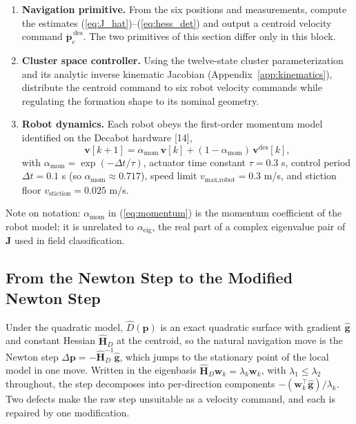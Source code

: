 \documentclass[lettersize,journal]{IEEEtran}
\begin{document}
\begin{enumerate}
    \item \textbf{Navigation primitive.} From the six positions and
          measurements, compute the estimates
          (\ref{eq:J_hat})--(\ref{eq:hess_det}) and output a centroid
          velocity command $\dot{\mathbf{p}}_c^{\,\text{des}}$. The two
          primitives of this section differ only in this block.
    \item \textbf{Cluster space controller.} Using the twelve-state
          cluster parameterization and its analytic inverse kinematic
          Jacobian (Appendix~\ref{app:kinematics}), distribute the
          centroid command to six robot velocity commands while
          regulating the formation shape to its nominal geometry.
    \item \textbf{Robot dynamics.} Each robot obeys the first-order
          momentum model identified on the Decabot hardware [14],
          \begin{equation}
              \mathbf{v}[k+1] = \alpha_{\text{mom}}\,\mathbf{v}[k]
              + (1 - \alpha_{\text{mom}})\,\mathbf{v}^{\text{des}}[k],
              \label{eq:momentum}
          \end{equation}
          with $\alpha_{\text{mom}} = \exp(-\Delta t/\tau)$, actuator
          time constant $\tau = 0.3$ s, control period $\Delta t = 0.1$ s
          (so $\alpha_{\text{mom}} \approx 0.717$), speed limit
          $v_{\text{max,robot}} = 0.3$ m/s, and stiction floor
          $v_{\text{stiction}} = 0.025$ m/s.
\end{enumerate}

Note on notation: $\alpha_{\text{mom}}$ in (\ref{eq:momentum}) is the
momentum coefficient of the robot model; it is unrelated to
$\alpha_{\text{eig}}$, the real part of a complex eigenvalue pair of
$\mathbf{J}$ used in field classification.

\subsection{From the Newton Step to the Modified Newton Step}
\label{sec:mod_newton}

Under the quadratic model, $\hat{D}(\mathbf{p})$ is an exact quadratic
surface with gradient $\hat{\mathbf{g}}$ and constant Hessian
$\hat{\mathbf{H}}_D$ at the centroid, so the natural navigation move is
the Newton step $\Delta\mathbf{p} = -\hat{\mathbf{H}}_D^{-1}
\hat{\mathbf{g}}$, which jumps to the stationary point of the local
model in one move. Written in the eigenbasis
$\hat{\mathbf{H}}_D \mathbf{w}_k = \lambda_k \mathbf{w}_k$, with
$\lambda_1 \leq \lambda_2$ throughout, the step decomposes into
per-direction components $-(\mathbf{w}_k^\top
\hat{\mathbf{g}})/\lambda_k$. Two defects make the raw step unsuitable
as a velocity command, and each is repaired by one modification.
\end{document}
